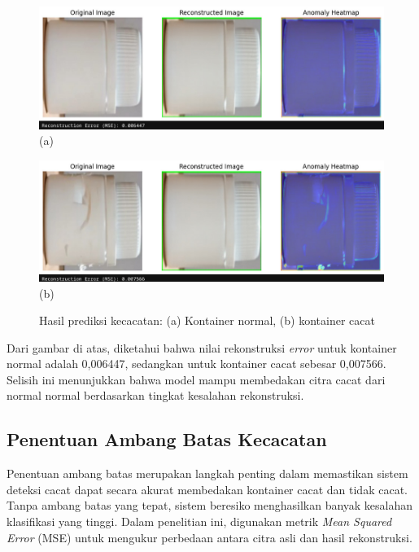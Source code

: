 \begin{figure}[H]
  \centering
  \begin{minipage}{\textwidth}
    \centering
    \includegraphics[width=\textwidth]{gambar/kontainer_bagus.jpeg}
    (a)
  \end{minipage}
  \vspace{1em}

  \begin{minipage}{\textwidth}
    \centering
    \includegraphics[width=\textwidth]{gambar/kontainer_cacat.jpeg}
    (b)
  \end{minipage}
  \caption{Hasil prediksi kecacatan: (a) Kontainer normal, (b)
  kontainer cacat}
  \label{fig:autoencoder-test}
  \vspace{-1em}
\end{figure}

Dari gambar di atas, diketahui bahwa nilai rekonstruksi
\textit{error} untuk kontainer
normal adalah 0,006447, sedangkan untuk kontainer cacat sebesar
0,007566. Selisih ini menunjukkan bahwa model mampu membedakan citra
cacat dari normal normal berdasarkan tingkat kesalahan rekonstruksi.

\vspace{1em}

\subsection{Penentuan Ambang Batas Kecacatan}
Penentuan ambang batas merupakan langkah penting dalam memastikan
sistem deteksi cacat dapat secara akurat membedakan kontainer cacat
dan tidak cacat. Tanpa ambang batas yang tepat, sistem beresiko
menghasilkan banyak kesalahan klasifikasi yang tinggi. Dalam
penelitian ini, digunakan metrik \textit{Mean Squared Error} (MSE) untuk
mengukur perbedaan antara citra asli dan hasil rekonstruksi.

